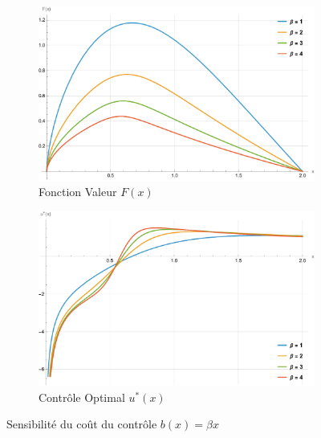 \FloatBarrier\begin{figure}[htb]
    \centering
    \begin{subfigure}{0.49\linewidth}
        \includegraphics[width=\linewidth]{img/validation/P1/p1_B_value.pdf}
        \caption{Fonction Valeur $F(x)$}\label{fig:BetaValueVisualisation1}
    \end{subfigure}
    \hfill
    \begin{subfigure}{0.49\linewidth}
        \includegraphics[width=\linewidth]{img/validation/P1/p1_B_control.pdf}
        \caption{Contrôle Optimal $u^*(x)$}\label{fig:BetaControlVisualisation1}
    \end{subfigure}
    \caption{Sensibilité du coût du contrôle $b(x)=\beta x$}\label{fig:BetaValueControlComparison}
\end{figure}

